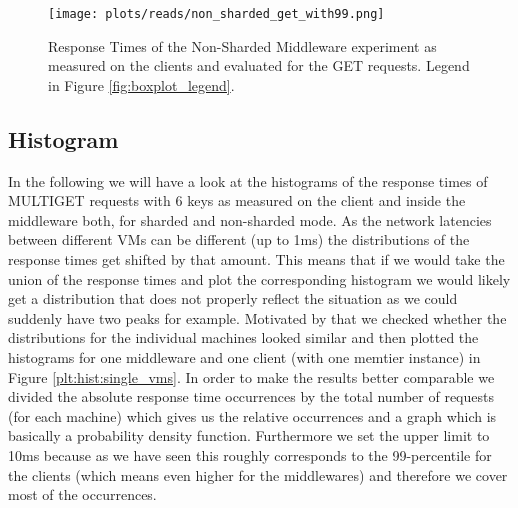 \documentclass[11pt,a4paper]{article}
\begin{document}
\begin{figure}[H]
\centering
    \texttt{[image: plots/reads/non\_sharded\_get\_with99.png]}
\caption{Response Times of the Non-Sharded Middleware experiment as measured on the clients and evaluated for the GET requests. Legend in Figure \ref{fig:boxplot_legend}.}
\label{plt:non_sharded_get_with99}
\end{figure}


\subsection{Histogram}\label{sub:histogram}
In the following we will have a look at the histograms of the response times of MULTIGET requests with 6 keys as measured on the client and inside the middleware both, for sharded and non-sharded mode. As the network latencies between different VMs can be different (up to 1ms) the distributions of the response times get shifted by that amount. This means that if we would take the union of the response times and plot the corresponding histogram we would likely get a distribution that does not properly reflect the situation as we could suddenly have two peaks for example. Motivated by that we checked whether the distributions for the individual machines looked similar and then plotted the histograms for one middleware and one client (with one memtier instance) in Figure \ref{plt:hist:single_vms}. In order to make the results better comparable we divided the absolute response time occurrences by the total number of requests (for each machine) which gives us the relative occurrences and a graph which is basically a probability density function. Furthermore we set the upper limit to 10ms because as we have seen this roughly corresponds to the 99-percentile for the clients (which means even higher for the middlewares) and therefore we cover most of the occurrences.\\
\end{document}
